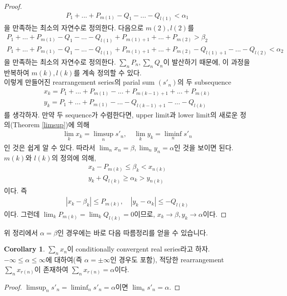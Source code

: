 \documentclass[12pt]{article}
\theoremstyle{definition}
\newtheorem{cor}[thm]{Corollary}
\newcommand{\abs}[1]{\left\vert#1\right\vert}
\begin{document}
\begin{proof}
\begin{gather*}
			P_1 + ... + P_{m(1)} - Q_1 - ... - Q_{l(1)} < \alpha_1
		\end{gather*}
		을 만족하는 최소의 자연수로 정의한다. 다음으로 \(m(2), l(2)\)를
		\begin{gather*}
			P_1 + ... + P_{m(1)} - Q_1 - ... - Q_{l(1)} + P_{m(1) + 1} + ... + P_{m(2)} > \beta_2\\
			P_1 + ... + P_{m(1)} - Q_1 - ... - Q_{l(1)} + P_{m(1) + 1} + ... + P_{m(2)} - Q_{l(1)+1} - ... - Q_{l(2)} < \alpha_2
		\end{gather*}
		을 만족하는 최소의 자연수로 정의한다. \(\sum_n P_n, \sum_n Q_n\)이 발산하기 때문에, 이 과정을 반복하여 \(m(k), l(k)\)를 계속 정의할 수 있다.\\
		이렇게 만들어진 rearrangement series의 parial sum \((s'_n)\)의 두 subsequence
		\begin{gather*}
			x_k = P_1 + ... + P_{m(1)} - ... + P_{m(k-1)+1} + ... + P_{m(k)}\\
			y_k = P_1 + ... + P_{m(1)} - ... - Q_{l(k-1)+1} - ... - Q_{l(k)}
		\end{gather*}
		를 생각하자. 만약 두 sequence가 수렴한다면, upper limit과 lower limit의 새로운 정의(Theorem \ref{limsup})에 의해
		\begin{align*}
			\lim_k x_k = \limsup_n s'_n, \quad \lim_k y_k = \liminf_n s'_n
		\end{align*}
		인 것은 쉽게 알 수 있다. 따라서 \(\lim_n x_n = \beta, \lim_n y_n = \alpha\)인 것을 보이면 된다. \(m(k)\)와 \(l(k)\)의 정의에 의해,
		\begin{gather*}
			x_k - P_{m(k)} \le \beta_k < x_{n(k)}\\
			y_k + Q_{l(k)} \ge \alpha_k > y_{n(k)}
		\end{gather*}
		이다. 즉
		\begin{gather*}
			\abs{x_k - \beta_k} \le P_{m(k)}, \quad \abs{y_k - \alpha_k} \le -Q_{l(k)}
		\end{gather*}
		이다. 그런데 \(\lim_k P_{m(k)} = \lim_k Q_{l(k)} = 0\)이므로, \(x_k \rightarrow \beta, y_k \rightarrow \alpha\)이다.
		
	\end{proof}

위 정리에서 \(\alpha = \beta\)인 경우에는 바로 다음 따름정리를 얻을 수 있습니다.

	\begin{cor}
		\(\sum_n x_n\)이 conditionally convergent real series라고 하자. \(-\infty \le \alpha \le \infty\)에 대하여(즉 \(\alpha = \pm \infty\)인 경우도 포함), 적당한 rearrangement \(\sum_n x_{r(n)}\)이 존재하여 \(\sum_n x_{r(n)} = \alpha\)이다.
	\end{cor}
	\begin{proof}
		\(\limsup_n s'_n = \liminf_n s'_n = \alpha\)이면 \(\lim_n s'_n = \alpha\).
	\end{proof}
\end{document}
